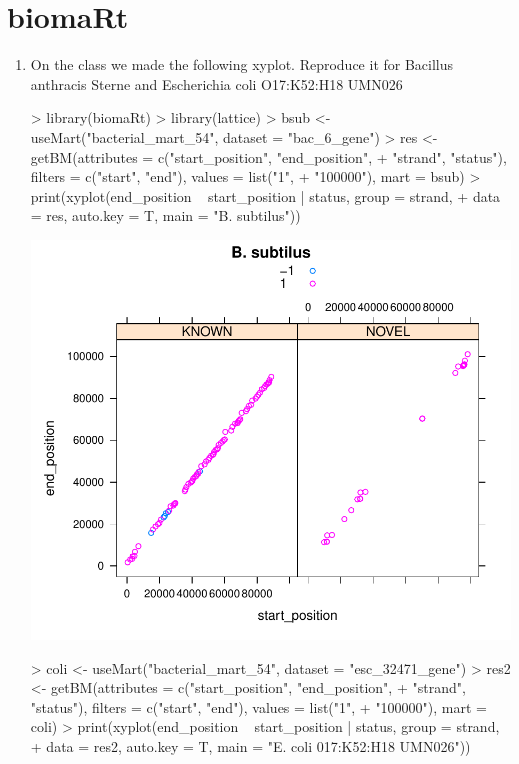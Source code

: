 \documentclass[letterpaper,12pt]{article}
\begin{document}
\section{biomaRt}
  \begin{enumerate}
  \item On the class we made the following xyplot. Reproduce it for Bacillus anthracis Sterne and Escherichia coli O17:K52:H18 UMN026
\begin{Schunk}
\begin{Sinput}
> library(biomaRt)
> library(lattice)
> bsub <- useMart("bacterial_mart_54", dataset = "bac_6_gene")
> res <- getBM(attributes = c("start_position", "end_position", 
+     "strand", "status"), filters = c("start", "end"), values = list("1", 
+     "100000"), mart = bsub)
> print(xyplot(end_position ~ start_position | status, group = strand, 
+     data = res, auto.key = T, main = "B. subtilus"))
\end{Sinput}
\end{Schunk}
\includegraphics{plots/fig-001}
\begin{Schunk}
\begin{Sinput}
> coli <- useMart("bacterial_mart_54", dataset = "esc_32471_gene")
> res2 <- getBM(attributes = c("start_position", "end_position", 
+     "strand", "status"), filters = c("start", "end"), values = list("1", 
+     "100000"), mart = coli)
> print(xyplot(end_position ~ start_position | status, group = strand, 
+     data = res2, auto.key = T, main = "E. coli 017:K52:H18 UMN026"))
\end{Sinput}

\end{Schunk}
\end{enumerate}
\end{document}
